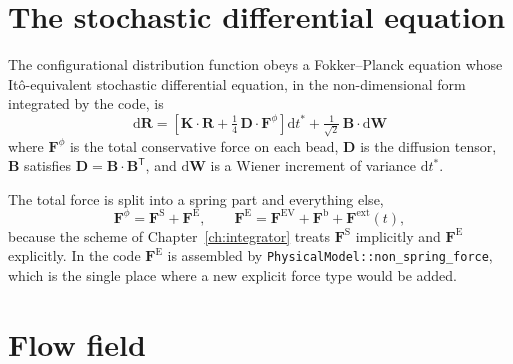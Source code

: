 \documentclass[11pt,a4paper]{report}
\newcommand{\D}{\bm{D}}
\newcommand{\B}{\bm{B}}
\newcommand{\R}{\bm{R}}
\newcommand{\code}[1]{\texttt{\seqsplitcode{#1}}}
\newcommand{\seqsplitcode}[1]{#1}
\begin{document}
\section{The stochastic differential equation}

The configurational distribution function obeys a Fokker--Planck equation whose
It\^{o}-equivalent stochastic differential equation, in the non-dimensional form
integrated by the code, is
\begin{equation}
  \boxed{\;
  \mathrm{d}\R = \left[\bm{K}\cdot\R + \tfrac{1}{4}\,\D\cdot\bm{F}^{\phi}\right]\mathrm{d}t^{*}
                 + \tfrac{1}{\sqrt{2}}\,\B\cdot\mathrm{d}\bm{W}\;}
  \label{eq:sde}
\end{equation}
where $\bm{F}^{\phi}$ is the total conservative force on each bead, $\D$ is the
diffusion tensor, $\B$ satisfies $\D = \B\cdot\B^{\mathsf{T}}$, and
$\mathrm{d}\bm{W}$ is a Wiener increment of variance $\mathrm{d}t^{*}$.

The total force is split into a spring part and everything else,
\begin{equation}
  \bm{F}^{\phi} = \bm{F}^{\mathrm{S}} + \bm{F}^{\mathrm{E}},
  \qquad
  \bm{F}^{\mathrm{E}} = \bm{F}^{\mathrm{EV}} + \bm{F}^{\mathrm{b}} + \bm{F}^{\mathrm{ext}}(t),
\end{equation}
because the scheme of Chapter~\ref{ch:integrator} treats $\bm{F}^{\mathrm{S}}$
implicitly and $\bm{F}^{\mathrm{E}}$ explicitly. In the code $\bm{F}^{\mathrm{E}}$
is assembled by \code{PhysicalModel::non\_spring\_force}, which is the single
place where a new explicit force type would be added.

\section{Flow field}
\label{sec:flow}
\end{document}
